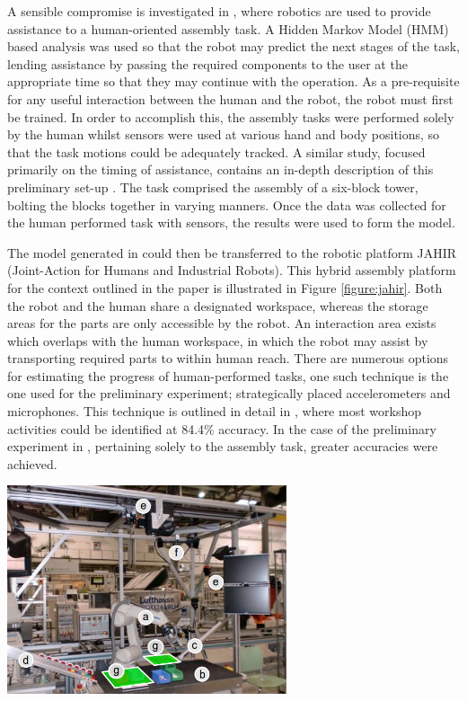 \documentclass[11pt]{article}
\begin{document}
A sensible compromise is investigated in \cite{lenz2011}, where robotics are used to provide assistance to a human-oriented assembly task. A Hidden Markov Model (HMM) based analysis was used so that the robot may predict the next stages of the task, lending assistance by passing the required components to the user at the appropriate time so that they may continue with the operation. As a pre-requisite for any useful interaction between the human and the robot, the robot must first be trained. In order to accomplish this, the assembly tasks were performed solely by the human whilst sensors were used at various hand and body positions, so that the task motions could be adequately tracked. A similar study, focused primarily on the timing of assistance, contains an in-depth description of this preliminary set-up \cite{huber2010}. The task comprised the assembly of a six-block tower, bolting the blocks together in varying manners. Once the data was collected for the human performed task with sensors, the results were used to form the model.

The model generated in \cite{lenz2011} could then be transferred to the robotic platform JAHIR (Joint-Action for Humans and Industrial Robots). This hybrid assembly platform for the context outlined in the paper is illustrated in Figure \ref{figure:jahir}. Both the robot and the human share a designated workspace, whereas the storage areas for the parts are only accessible by the robot. An interaction area exists which overlaps with the human workspace, in which the robot may assist by transporting required parts to within human reach. There are numerous options for estimating the progress of human-performed tasks, one such technique is the one used for the preliminary experiment; strategically placed accelerometers and microphones. This technique is outlined in detail in \cite{lukowicz2004}, where most workshop activities could be identified at 84.4\% accuracy. In the case of the preliminary experiment in \cite{lenz2011}, pertaining solely to the assembly task, greater accuracies were achieved.

\begin{center}
\includegraphics[width = 0.62\textwidth]{jahir.png}
\label{figure:jahir}
\end{center}
\end{document}
